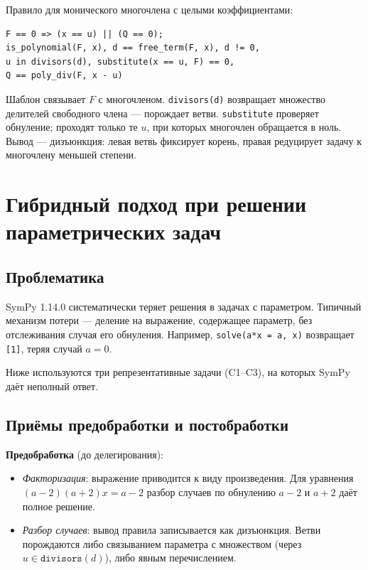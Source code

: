 Правило для монического многочлена с целыми коэффициентами:

\begin{lstlisting}
F == 0 => (x == u) || (Q == 0);
is_polynomial(F, x), d == free_term(F, x), d != 0,
u in divisors(d), substitute(x == u, F) == 0,
Q == poly_div(F, x - u)
\end{lstlisting}

Шаблон связывает $F$ с многочленом. \texttt{divisors(d)} возвращает 
множество делителей свободного члена --- порождает ветви. 
\texttt{substitute} проверяет обнуление; проходят только те $u$, 
при которых многочлен обращается в ноль. Вывод --- дизъюнкция: 
левая ветвь фиксирует корень, правая редуцирует задачу к многочлену 
меньшей степени.

\section{Гибридный подход при решении параметрических задач}

\subsection{Проблематика}

SymPy 1.14.0 систематически теряет решения в задачах с параметром. 
Типичный механизм потери --- деление на выражение, содержащее параметр, 
без отслеживания случая его обнуления. Например, 
\texttt{solve(a*x = a, x)} возвращает \texttt{[1]}, теряя случай 
$a = 0$.

Ниже используются три репрезентативные задачи (C1--C3), на которых 
SymPy даёт неполный ответ.

\subsection{Приёмы предобработки и постобработки}

\textbf{Предобработка} (до делегирования):

\begin{itemize}
  \item \emph{Факторизация}: выражение приводится к виду произведения. 
    Для уравнения $(a-2)(a+2)x = a-2$ разбор случаев по обнулению 
    $a-2$ и $a+2$ даёт полное решение.
  \item \emph{Разбор случаев}: вывод правила записывается как дизъюнкция. 
    Ветви порождаются либо связыванием параметра с множеством 
    (через $u \in \texttt{divisors}(d)$), либо явным перечислением.
\end{itemize}

